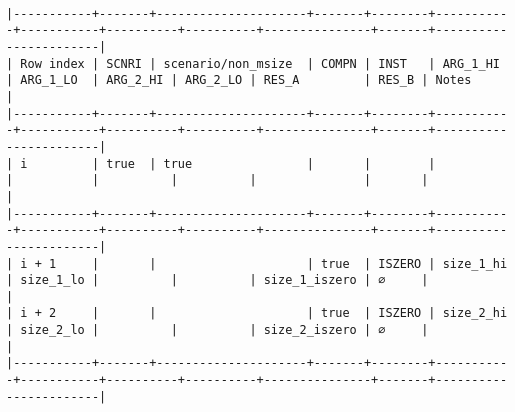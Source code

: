 \documentclass[varwidth=\maxdimen,margin=0.5cm,multi={verbatim}]{standalone}
\begin{document}
\begin{verbatim}

|-----------+-------+---------------------+-------+--------+-----------+-----------+----------+----------+---------------+-------+-----------------------|
| Row index | SCNRI | scenario/non_msize  | COMPN | INST   | ARG_1_HI  | ARG_1_LO  | ARG_2_HI | ARG_2_LO | RES_A         | RES_B | Notes                 |
|-----------+-------+---------------------+-------+--------+-----------+-----------+----------+----------+---------------+-------+-----------------------|
| i         | true  | true                |       |        |           |           |          |          |               |       |                       |
|-----------+-------+---------------------+-------+--------+-----------+-----------+----------+----------+---------------+-------+-----------------------|
| i + 1     |       |                     | true  | ISZERO | size_1_hi | size_1_lo |          |          | size_1_iszero | ∅     |                       |
| i + 2     |       |                     | true  | ISZERO | size_2_hi | size_2_lo |          |          | size_2_iszero | ∅     |                       |
|-----------+-------+---------------------+-------+--------+-----------+-----------+----------+----------+---------------+-------+-----------------------|

\end{verbatim}
\end{document}
